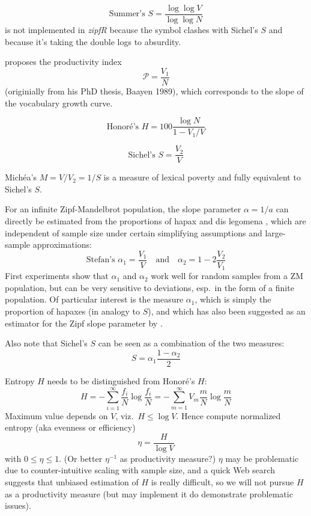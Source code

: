 \documentclass[a4paper]{article}
\begin{document}
\begin{equation}
  \label{eq:prod:summer-S}
  \text{Summer's } S = \frac{\log \log V}{\log \log N}
\end{equation}
is not implemented in \emph{zipfR} because the symbol clashes with Sichel's
$S$ and because it's taking the double logs to absurdity.

\citet{Baayen:92} proposes the productivity index
\[
\mathscr{P} = \frac{V_1}{N}
\]
(originially from his PhD thesis, Baayen 1989), which corresponds to the slope
of the vocabulary growth curve.

\begin{equation}
  \label{eq:prod:honore-H}
  \text{Honoré's } H = 100 \frac{\log N}{1 - V_1 / V}
\end{equation}

\begin{equation}
  \label{eq:prod:sichel-S}
  \text{Sichel's } S = \frac{V_2}{V}
\end{equation}

Michéa's $M = V / V_2 = 1/S$ is a measure of lexical poverty and fully
equivalent to Sichel's $S$.

For an infinite Zipf-Mandelbrot population, the slope parameter $\alpha = 1/a$
can directly be estimated from the proportions of hapax
\citep[130]{Evert:04phd} and dis legomena \citep[127]{Evert:04phd}, which are
independent of sample size under certain simplifying assumptions and
large-sample approximations:
\[
\text{Stefan's } 
\alpha_1 = \frac{V_1}{V} \quad\text{and}\quad
\alpha_2 = 1 - 2\frac{V_2}{V_1} 
\]
First experiments show that $\alpha_1$ and $\alpha_2$ work well for random
samples from a ZM population, but can be very sensitive to deviations, esp.\
in the form of a finite population.  Of particular interest is the measure
$\alpha_1$, which is simply the proportion of hapaxes (in analogy to $S$),
and which has also been suggested as an estimator for the Zipf slope parameter
by \citet[172]{Rouault:78}.

Also note that Sichel's $S$ can be seen as a combination of the two measures:
\[
S = \alpha_1 \frac{1 - \alpha_2}{2}
\]

Entropy $H$ needs to be distinguished from Honoré's $H$:
\begin{equation}
  \label{eq:prod:entropy}
  H = - \sum_{i=1}^{\infty} \frac{f_i}{N} \log \frac{f_i}{N}
  = -\sum_{m=1}^{\infty} V_m \frac{m}{N} \log \frac{m}{N}
\end{equation}
Maximum value depends on $V$, viz.\ $H\leq \log V$. Hence compute normalized
entropy (aka evenness or efficiency)
\begin{equation}
  \label{eq:prod:evenness}
  \eta = \frac{H}{\log V}
\end{equation}
with $0\leq \eta\leq 1$. (Or better $\eta^{-1}$ as productivity measure?)
$\eta$ may be problematic due to counter-intuitive scaling with sample size,
and a quick Web search suggests that unbiased estimation of $H$ is really
difficult, so we will not pursue $H$ as a productivity measure (but may
implement it do demonstrate problematic issues).
\end{document}
